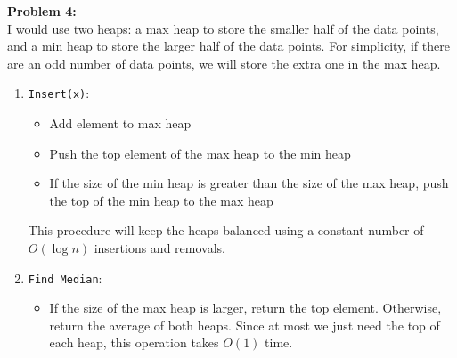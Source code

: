 \documentclass{article}
\begin{document}
\textbf{Problem 4:} \\[1.0ex]
I would use two heaps: a max heap to store the smaller half of the data points, and a min heap to store the larger half of the data points. For simplicity, if there are an odd number of data points, we will store the extra one in the max heap.
\begin{enumerate}
    \item \texttt{Insert(x)}: 
    \begin{itemize}
        \item Add element to max heap
        \item Push the top element of the max heap to the min heap
        \item If the size of the min heap is greater than the size of the max heap, push the top of the min heap to the max heap
    \end{itemize}
    This procedure will keep the heaps balanced using a constant number of $O( \log n)$ insertions and removals.
    \item \texttt{Find Median}: 
    \begin{itemize}
        \item If the size of the max heap is larger, return the top element. Otherwise, return the average of both heaps. Since at most we just need the top of each heap, this operation takes $O(1)$ time.
    \end{itemize}
\end{enumerate}
\end{document}
